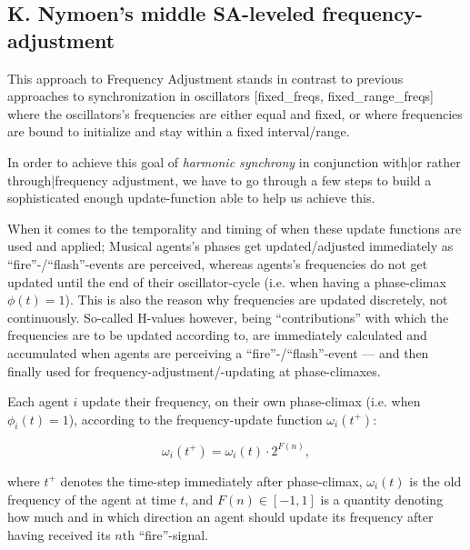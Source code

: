 	
	

	
	\subsection{K. Nymoen's middle SA-leveled frequency-adjustment}
	
	This approach to Frequency Adjustment stands in contrast to previous approaches to synchronization in oscillators [fixed\_freqs, fixed\_range\_freqs] where the oscillators's frequencies are either equal and fixed, or where frequencies are bound to initialize and stay within a fixed interval/range.
	
	In order to achieve this goal of \textit{harmonic synchrony} in conjunction with|or rather through|frequency adjustment, we have to go through a few steps to build a sophisticated enough update-function able to help us achieve this.
	
	When it comes to the temporality and timing of when these update functions are used and applied; Musical agents's phases get updated/adjusted immediately as ``fire''-/``flash''-events are perceived, whereas agents's frequencies do not get updated until the end of their oscillator-cycle (i.e. when having a phase-climax $\phi(t)=1$). This is also the reason why frequencies are updated discretely, not continuously. So-called H-values however, being ``contributions'' with which the frequencies are to be updated according to, are immediately calculated and accumulated when agents are perceiving a ``fire''-/``flash''-event — and then finally used for frequency-adjustment/-updating at phase-climaxes.
			
	Each agent $i$ update their frequency, on their own phase-climax (i.e. when $\phi_i(t)=1$), according to the frequency-update function $\omega_i(t^+)$:
	
	\begin{equation}
		\omega_i(t^+) = \omega_i(t) \cdot 2^{F(n)},
	\end{equation}
	
	where $t^+$ denotes the time-step immediately after phase-climax, $\omega_i(t)$ is the old frequency of the agent at time $t$, and $F(n) \in [-1,1]$ is a quantity denoting how much and in which direction an agent should update its frequency after having received its $n$th ``fire''-signal.
	
